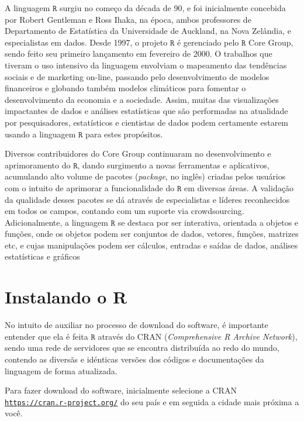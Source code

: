 \documentclass[
]{book}
\begin{document}
A linguagem \(\texttt{R}\) surgiu no começo da década de 90, e foi inicialmente concebida por Robert Gentleman e Ross Ihaka, na época, ambos professores de Departamento de Estatística da Universidade de Auckland, na Nova Zelândia, e especialistas em dados. Desde 1997, o projeto \(\texttt{R}\) é gerenciado pelo \(\texttt{R}\) Core Group, sendo feito seu primeiro lançamento em fevereiro de 2000. O trabalhos que tiveram o uso intensivo da linguagem envolviam o mapeamento das tendências sociais e de marketing on-line, passando pelo desenvolvimento de modelos financeiros e globando também modelos climáticos para fomentar o desenvolvimento da economia e a sociedade. Assim, muitas das visualizações impactantes de dados e análises estatísticas que são performadas na atualidade por pesquisadores, estatísticos e cientistas de dados podem certamente estarem usando a linguagem \(\texttt{R}\) para estes propósitos.

Diversos contribuidores do Core Group continuaram no desenvolvimento e aprimoramento do \(\texttt{R}\), dando surgimento a novas ferramentas e aplicativos, acumulando alto volume de pacotes (\emph{package}, no inglês) criadas pelos usuários com o intuito de aprimorar a funcionalidade do \(\texttt{R}\) em diversas áreas. A validação da qualidade desses pacotes se dá através de especialistas e líderes reconhecidos em todos os campos, contando com um suporte via crowdsourcing. Adicionalmente, a linguagem \(\texttt{R}\) se destaca por ser interativa, orientada a objetos e funções, onde os objetos podem ser conjuntos de dados, vetores, funções, matrizes etc, e cujas manipulações podem ser cálculos, entradas e saídas de dados, análises estatísticas e gráficos

\hypertarget{instalando-o-r}{%
\section{Instalando o R}\label{instalando-o-r}}

No intuito de auxiliar no processo de download do software, é importante entender que ela é feita \(\texttt{R}\) através do CRAN (\emph{Comprehensive R Archive Network}), sendo uma rede de servidores que se encontra distribuída ao redo do mundo, contendo as diversãs e idénticas versões dos códigos e documentações da linguagem de forma atualizada.

Para fazer download do software, inicialmente selecione a CRAN \href{https://cran.r-project.org/}{\texttt{https://cran.r-project.org/}} do seu país e em seguida a cidade mais próxima a você.
\end{document}
